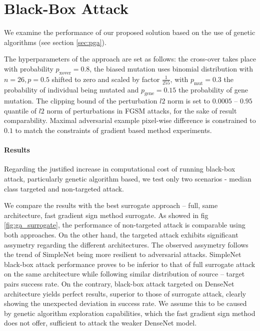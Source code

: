 \section{Black-Box Attack}
\label{sec:blackbox_ga}
We examine the performance of our proposed solution based on the use of genetic algorithms (see section \ref{sec:pga}).

The hyperparameters of the approach are set as follows: the cross-over takes place with probability $p_\text{xover} = 0.8$, the biased mutation uses binomial distribution with $n = 26, p = 0.5$ shifted to zero and scaled by factor $\frac{1}{255}$, with $p_\text{mut} = 0.3$ the probability of individual being mutated and $p_\text{gene} = 0.15$ the probability of gene mutation. The clipping bound of the perturbation $l2$ norm is set to $0.0005$ -- $0.95$ quantile of $l2$ norm of perturbations in FGSM attacks, for the sake of result comparability. Maximal adversarial example pixel-wise difference is constrained to $0.1$ to match the constraints of gradient based method experiments.

\paragraph{Results}
Regarding the justified increase in computational cost of running black-box attack, particularly genetic algorithm based, we test only two scenarios - median class targeted and non-targeted attack.

We compare the results with the best surrogate approach -- full, same architecture, fast gradient sign method surrogate. As showed in fig \ref{fig:ga_surrogate}, the performance of non-targeted attack is comparable using both approaches. On the other hand, the targeted attack exhibits significant assymetry regarding the different architectures. The observed assymetry follows the trend of SimpleNet being more resilient to adversarial attacks. SimpleNet black-box attack performance proves to be inferior to that of full surrogate attack on the same architecture while following similar distribution of source -- target pairs success rate. On the contrary, black-box attack targeted on DenseNet architecture yields perfect results, superior to those of surrogate attack, clearly showing the unexpected deviation in success rate. We assume this to be caused by genetic algorithm exploration capabilities, which the fast gradient sign method does not offer, sufficient to attack the weaker DenseNet model.

